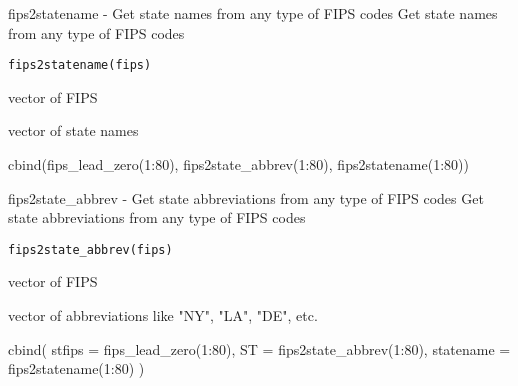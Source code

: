 \documentclass[a4paper]{book}
\begin{document}
%
\begin{Description}\relax
fips2statename - Get state names from any type of FIPS codes
Get state names from any type of FIPS codes
\end{Description}
%
\begin{Usage}
\begin{verbatim}
fips2statename(fips)
\end{verbatim}
\end{Usage}
%
\begin{Arguments}
\begin{ldescription}
\item[\code{fips}] vector of FIPS
\end{ldescription}
\end{Arguments}
%
\begin{Value}
vector of state names
\end{Value}
%
\begin{Examples}
\begin{ExampleCode}
  cbind(fips_lead_zero(1:80), fips2state_abbrev(1:80), fips2statename(1:80))
\end{ExampleCode}
\end{Examples}
%
\begin{Description}\relax
fips2state\_abbrev - Get state abbreviations from any type of FIPS codes
Get state abbreviations from any type of FIPS codes
\end{Description}
%
\begin{Usage}
\begin{verbatim}
fips2state_abbrev(fips)
\end{verbatim}
\end{Usage}
%
\begin{Arguments}
\begin{ldescription}
\item[\code{fips}] vector of FIPS
\end{ldescription}
\end{Arguments}
%
\begin{Value}
vector of abbreviations like "NY", "LA", "DE", etc.
\end{Value}
%
\begin{Examples}
\begin{ExampleCode}
  cbind(
    stfips    = fips_lead_zero(1:80), 
    ST     = fips2state_abbrev(1:80), 
    statename = fips2statename(1:80)
  )
\end{ExampleCode}
\end{Examples}
\end{document}
